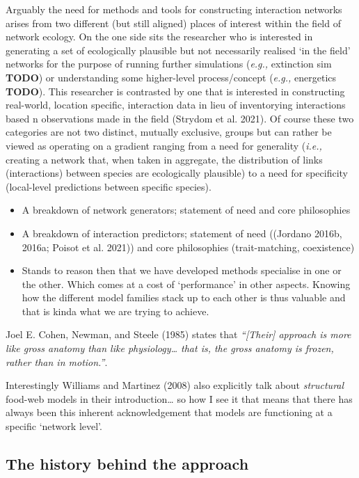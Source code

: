 \documentclass[
  letterpaper,
  DIV=11,
  numbers=noendperiod]{scrartcl}
\begin{document}
Arguably the need for methods and tools for constructing interaction
networks arises from two different (but still aligned) places of
interest within the field of network ecology. On the one side sits the
researcher who is interested in generating a set of ecologically
plausible but not necessarily realised `in the field' networks for the
purpose of running further simulations (\emph{e.g.,} extinction sim
\textbf{TODO}) or understanding some higher-level process/concept
(\emph{e.g.,} energetics \textbf{TODO}). This researcher is contrasted
by one that is interested in constructing real-world, location specific,
interaction data in lieu of inventorying interactions based n
observations made in the field (Strydom et al. 2021). Of course these
two categories are not two distinct, mutually exclusive, groups but can
rather be viewed as operating on a gradient ranging from a need for
generality (\emph{i.e.,} creating a network that, when taken in
aggregate, the distribution of links (interactions) between species are
ecologically plausible) to a need for specificity (local-level
predictions between specific species).

\begin{itemize}
\item
  A breakdown of network generators; statement of need and core
  philosophies
\item
  A breakdown of interaction predictors; statement of need ((Jordano
  2016b, 2016a; Poisot et al. 2021)) and core philosophies
  (trait-matching, coexistence)
\item
  Stands to reason then that we have developed methods specialise in one
  or the other. Which comes at a cost of `performance' in other aspects.
  Knowing how the different model families stack up to each other is
  thus valuable and that is kinda what we are trying to achieve.
\end{itemize}

Joel E. Cohen, Newman, and Steele (1985) states that \emph{``{[}Their{]}
approach is more like gross anatomy than like physiology\ldots{} that
is, the gross anatomy is frozen, rather than in motion.''}.

Interestingly Williams and Martinez (2008) also explicitly talk about
\emph{structural} food-web models in their introduction\ldots{} so how I
see it that means that there has always been this inherent
acknowledgement that models are functioning at a specific `network
level'.

\subsection{The history behind the
approach}\label{the-history-behind-the-approach}
\end{document}
